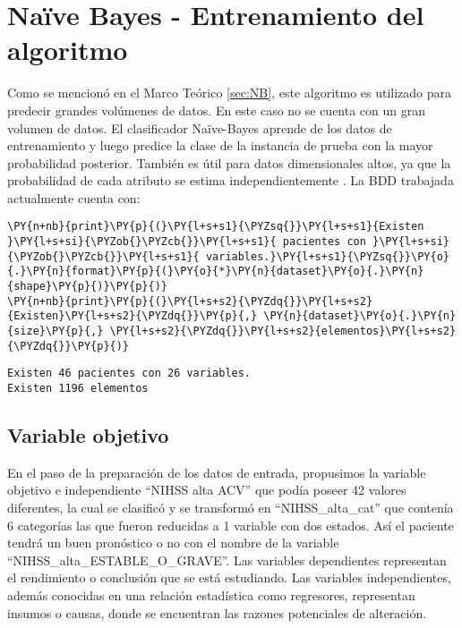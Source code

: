     \hypertarget{nauxefve-bayes---entrenamiento-del-algoritmo}{%
\section{Naïve Bayes - Entrenamiento del algoritmo}\label{nauxefve-bayes---entrenamiento-del-algoritmo}}
 
	Como se mencionó en el Marco Teórico \ref{sec:NB}, este algoritmo es utilizado para predecir grandes volúmenes de datos. En este caso no se cuenta con un gran volumen de datos. El clasificador Naïve-Bayes aprende de los datos de entrenamiento y luego predice la clase de la instancia de prueba con la mayor probabilidad posterior. También es útil para datos dimensionales altos, ya que la probabilidad de cada atributo se estima independientemente \cite{Mosquera2018}.
	La BDD trabajada actualmente cuenta con:

    \begin{tcolorbox}[breakable, size=fbox, boxrule=1pt, pad at break*=1mm,colback=cellbackground, colframe=cellborder]
\begin{Verbatim}[commandchars=\\\{\}]
\PY{n+nb}{print}\PY{p}{(}\PY{l+s+s1}{\PYZsq{}}\PY{l+s+s1}{Existen }\PY{l+s+si}{\PYZob{}\PYZcb{}}\PY{l+s+s1}{ pacientes con }\PY{l+s+si}{\PYZob{}\PYZcb{}}\PY{l+s+s1}{ variables.}\PY{l+s+s1}{\PYZsq{}}\PY{o}{.}\PY{n}{format}\PY{p}{(}\PY{o}{*}\PY{n}{dataset}\PY{o}{.}\PY{n}{shape}\PY{p}{)}\PY{p}{)}
\PY{n+nb}{print}\PY{p}{(}\PY{l+s+s2}{\PYZdq{}}\PY{l+s+s2}{Existen}\PY{l+s+s2}{\PYZdq{}}\PY{p}{,} \PY{n}{dataset}\PY{o}{.}\PY{n}{size}\PY{p}{,} \PY{l+s+s2}{\PYZdq{}}\PY{l+s+s2}{elementos}\PY{l+s+s2}{\PYZdq{}}\PY{p}{)}
\end{Verbatim}
\end{tcolorbox}

    \begin{Verbatim}[commandchars=\\\{\}]
Existen 46 pacientes con 26 variables.
Existen 1196 elementos
    \end{Verbatim}

    \hypertarget{variable-categuxf3rica}{%
\subsection{Variable objetivo}\label{NB:variable-categuxf3rica}}

	En el paso de la preparación de los datos de entrada, propusimos la variable objetivo e independiente ``NIHSS alta ACV'' que podía poseer 42 valores diferentes, la cual se clasificó y se transformó en ``NIHSS\_alta\_cat'' que contenía 6 categorías las que fueron reducidas a 1 variable con dos estados. Así el paciente tendrá un buen pronóstico o no con el nombre de la variable ``NIHSS\_alta\_ESTABLE\_O\_GRAVE''. 
	Las variables dependientes representan el rendimiento o conclusión que se está estudiando. Las variables independientes, además conocidas en una relación estadística como regresores, representan insumos o causas, donde se encuentran las razones potenciales de alteración.

